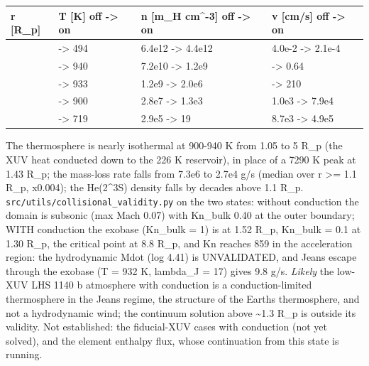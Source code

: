 \documentclass[english,a4paper]{my_memo}
\begin{document}
{\def\LTcaptype{none} %
{\small
\begin{longtable}[]{@{}>{\raggedright\arraybackslash}p{\dimexpr(\linewidth-8\tabcolsep)/4\relax}>{\raggedright\arraybackslash}p{\dimexpr(\linewidth-8\tabcolsep)/4\relax}>{\raggedright\arraybackslash}p{\dimexpr(\linewidth-8\tabcolsep)/4\relax}>{\raggedright\arraybackslash}p{\dimexpr(\linewidth-8\tabcolsep)/4\relax}@{}}
\toprule\noalign{}
r {[}R\_p{]} & T {[}K{]} off -\textgreater{} on & n {[}m\_H cm\^{}-3{]} off -\textgreater{} on & v {[}cm/s{]} off -\textgreater{} on \\
\midrule\noalign{}
\endhead
\bottomrule\noalign{}
\endlastfoot
1.01 & 1041 -\textgreater{} 494 & 6.4e12 -\textgreater{} 4.4e12 & 4.0e-2 -\textgreater{} 2.1e-4 \\
1.10 & 3463 -\textgreater{} 940 & 7.2e10 -\textgreater{} 1.2e9 & 3.0 -\textgreater{} 0.64 \\
1.50 & 7246 -\textgreater{} 933 & 1.2e9 -\textgreater{} 2.0e6 & 94 -\textgreater{} 210 \\
3.0 & 3182 -\textgreater{} 900 & 2.8e7 -\textgreater{} 1.3e3 & 1.0e3 -\textgreater{} 7.9e4 \\
10 & 740 -\textgreater{} 719 & 2.9e5 -\textgreater{} 19 & 8.7e3 -\textgreater{} 4.9e5 \\
\end{longtable}
}
}

The thermosphere is nearly isothermal at 900-940 K from 1.05 to 5 R\_p (the
XUV heat conducted down to the 226 K reservoir), in place of a 7290 K peak
at 1.43 R\_p; the mass-loss rate falls from 7.3e6 to 2.7e4 g/s (median over
r \textgreater= 1.1 R\_p, x0.004); the He(2\^{}3S) density falls by decades above 1.1 R\_p.
\texttt{src/utils/collisional\_validity.py} on the two states: without conduction
the domain is subsonic (max Mach 0.07) with Kn\_bulk 0.40 at the outer
boundary; WITH conduction the exobase (Kn\_bulk = 1) is at 1.52 R\_p, Kn\_bulk
= 0.1 at 1.30 R\_p, the critical point at 8.8 R\_p, and Kn reaches 859 in the
acceleration region: the hydrodynamic Mdot (log 4.41) is UNVALIDATED, and
Jeans escape through the exobase (T = 932 K, lambda\_J = 17) gives 9.8 g/s.
\emph{Likely} the low-XUV LHS 1140 b atmosphere with conduction is a
conduction-limited thermosphere in the Jeans regime, the structure of the
Earth\textquotesingle s thermosphere, and not a hydrodynamic wind; the continuum solution
above \textasciitilde1.3 R\_p is outside its validity. Not established: the fiducial-XUV
cases with conduction (not yet solved), and the element enthalpy flux,
whose continuation from this state is running.
\end{document}
